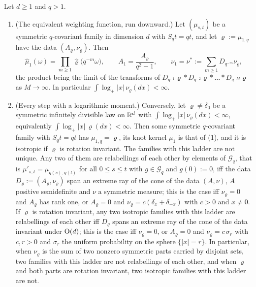 \begin{proposition}
\label{prop:ladder-knot-kernel}

Let $d \ge 1$ and $q > 1$.
\begin{enumerate}
\item (The equivalent weighting function, run downward.) Let $(\mu_{s,t})$ be a symmetric
$q$-covariant family in dimension $d$ with $S_qt = qt$, and let $\varrho := \mu_{1,q}$ have the data
$(A_\varrho, \nu_\varrho)$. Then
\[
  \widehat\mu_1(\omega) = \prod_{m \ge 1}\widehat\varrho\bigl(q^{-m}\omega\bigr), \qquad
  A_1 = \frac{A_\varrho}{q^2 - 1}, \qquad \nu_1 = \nu^* := \sum_{m \ge 1}D_{q^{-m}}\nu_\varrho,
\]
the product being the limit of the transforms of
$D_{q^{-1}}\varrho * D_{q^{-2}}\varrho * \dots * D_{q^{-M}}\varrho$ as $M \to \infty$. In particular
$\int\log_+|x|\,\nu_\varrho(dx) < \infty$.
\item (Every step with a logarithmic moment.) Conversely, let $\varrho \ne \delta_0$ be a symmetric
infinitely divisible law on $\mathbb{R}^d$ with $\int\log_+|x|\,\nu_\varrho(dx) < \infty$, equivalently
$\int\log_+|x|\,\varrho(dx) < \infty$. Then some symmetric $q$-covariant family with $S_qt = qt$ has
$\mu_{1,q} = \varrho$, its knot kernel $\mu_1$ is that of (1), and it is isotropic if $\varrho$ is
rotation invariant. The families with this ladder are not unique.
Any two of them are relabellings of each other by elements of $\mathcal{G}_q$, that is
$\mu'_{s,t} = \mu_{g(s),g(t)}$ for all $0 \le s \le t$ with $g \in \mathcal{G}_q$ and $g(0) := 0$,
iff the data $D_\varrho := (A_\varrho, \nu_\varrho)$ span an extreme ray of the cone of the data
$(A, \nu)$, $A$ positive semidefinite and $\nu$ a symmetric \Levy{} measure; this is the case iff
$\nu_\varrho = 0$ and $A_\varrho$ has rank one, or $A_\varrho = 0$ and
$\nu_\varrho = c(\delta_x + \delta_{-x})$ with $c > 0$ and $x \ne 0$. If $\varrho$ is rotation
invariant, any two isotropic families with this ladder are relabellings of each other iff
$D_\varrho$ spans an extreme ray of the cone of the data invariant under $\mathrm{O}(d)$; this is the
case iff $\nu_\varrho = 0$, or $A_\varrho = 0$ and $\nu_\varrho = c\,\sigma_r$ with $c, r > 0$ and
$\sigma_r$ the uniform probability on the sphere $\{|x| = r\}$. In particular, when $\nu_\varrho$ is
the sum of two nonzero symmetric parts carried by disjoint sets, two families with this ladder are
not relabellings of each other, and when $\varrho$ and both parts are rotation invariant, two
isotropic families with this ladder are not.

\end{enumerate}
\end{proposition}
